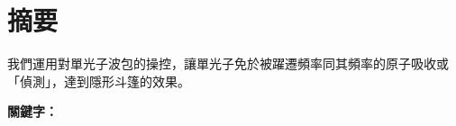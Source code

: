 \documentclass[class=NCU_thesis, crop=false]{standalone}
\begin{document}
\chapter{摘要}
我們運用對單光子波包的操控，讓單光子免於被躍遷頻率同其頻率的原子吸收或「偵測」，達到隱形斗篷的效果。

\vspace{2em}
\noindent \textbf{關鍵字：} \keywordsZh{} %
\end{document}
